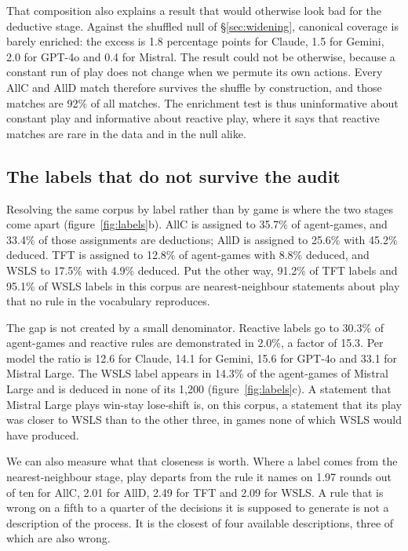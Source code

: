 \documentclass[11pt,a4paper]{article}
\begin{document}
That composition also explains a result that would otherwise look bad for the
deductive stage. Against the shuffled null of \S\ref{sec:widening}, canonical
coverage is barely enriched: the excess is 1.8 percentage points for Claude,
1.5 for Gemini, 2.0 for GPT-4o and 0.4 for Mistral. The result could not be
otherwise, because a constant run of play does not change when we permute its
own actions. Every AllC and AllD match therefore survives the shuffle by
construction, and those matches are 92\% of all matches. The enrichment test
is thus uninformative about constant play and informative about reactive play,
where it says that reactive matches are rare in the data and in the null
alike.

\subsection{The labels that do not survive the audit}
\label{sec:labels}

Resolving the same corpus by label rather than by game is where the two stages
come apart (figure~\ref{fig:labels}b). AllC is assigned to 35.7\% of
agent-games, and 33.4\% of those assignments are deductions; AllD is assigned
to 25.6\% with 45.2\% deduced. TFT is assigned to 12.8\% of agent-games with
8.8\% deduced, and WSLS to 17.5\% with 4.9\% deduced. Put the other way,
91.2\% of TFT labels and 95.1\% of WSLS labels in this corpus are
nearest-neighbour statements about play that no rule in the vocabulary
reproduces.

The gap is not created by a small denominator. Reactive labels go to 30.3\% of
agent-games and reactive rules are demonstrated in 2.0\%, a factor of 15.3.
Per model the ratio is 12.6 for Claude, 14.1 for Gemini, 15.6 for GPT-4o and
33.1 for Mistral Large. The WSLS label appears in 14.3\% of the agent-games of
Mistral Large and is deduced in none of its 1{,}200
(figure~\ref{fig:labels}c). A statement that Mistral Large plays win-stay
lose-shift is, on this corpus, a statement that its play was closer to WSLS
than to the other three, in games none of which WSLS would have produced.

We can also measure what that closeness is worth. Where a label comes from the
nearest-neighbour stage, play departs from the rule it names on 1.97 rounds
out of ten for AllC, 2.01 for AllD, 2.49 for TFT and 2.09 for WSLS. A rule
that is wrong on a fifth to a quarter of the decisions it is supposed to
generate is not a description of the process. It is the closest of four
available descriptions, three of which are also wrong.
\end{document}
